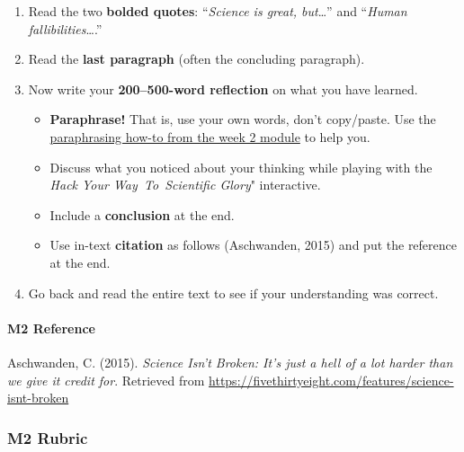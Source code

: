 \documentclass[
  openany]{book}
\begin{document}
\begin{enumerate}
\def\labelenumi{\arabic{enumi}.}
\setcounter{enumi}{5}
\item
  Read the two \textbf{bolded quotes}: ``\emph{Science is great, but}\ldots{}'' and ``\emph{Human fallibilities}\ldots{}.''
\item
  Read the \textbf{last paragraph} (often the concluding paragraph).
\item
  Now write your \textbf{200--500-word reflection} on what you have learned.

  \begin{itemize}
  \item
    \textbf{Paraphrase!} That is, use your own words, don't copy/paste. Use the \href{https://q.utoronto.ca/courses/204826/pages/w2-paraphrasing}{paraphrasing how-to from the week 2 module} to help you.
  \item
    Discuss what you noticed about your thinking while playing with the \emph{Hack Your Way~To~Scientific Glory}" interactive.
  \item
    Include a \textbf{conclusion} at the end.
  \item
    Use in-text \textbf{citation} as follows (Aschwanden, 2015) and put the reference at the end.
  \end{itemize}
\item
  Go back and read the entire text to see if your understanding was correct.
\end{enumerate}

\hypertarget{m2-reference}{%
\paragraph{M2 Reference}\label{m2-reference}}

Aschwanden, C. (2015). \emph{Science Isn't Broken: It's just a hell of a lot harder than we give it credit for}. Retrieved from \url{https://fivethirtyeight.com/features/science-isnt-broken}

\hypertarget{m2-rubric}{%
\subsubsection{M2 Rubric}\label{m2-rubric}}
\end{document}

